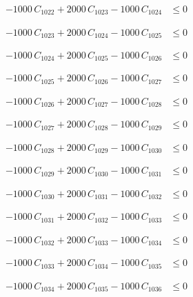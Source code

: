 \documentclass[a4paper,11pt]{article}
\begin{document}
\begin{align}
-1000\,C_{1022} + 2000\,C_{1023} - 1000\,C_{1024} &\leq 0 \nonumber
\end{align}

\begin{align}
-1000\,C_{1023} + 2000\,C_{1024} - 1000\,C_{1025} &\leq 0 \nonumber
\end{align}

\begin{align}
-1000\,C_{1024} + 2000\,C_{1025} - 1000\,C_{1026} &\leq 0 \nonumber
\end{align}

\begin{align}
-1000\,C_{1025} + 2000\,C_{1026} - 1000\,C_{1027} &\leq 0 \nonumber
\end{align}

\begin{align}
-1000\,C_{1026} + 2000\,C_{1027} - 1000\,C_{1028} &\leq 0 \nonumber
\end{align}

\begin{align}
-1000\,C_{1027} + 2000\,C_{1028} - 1000\,C_{1029} &\leq 0 \nonumber
\end{align}

\begin{align}
-1000\,C_{1028} + 2000\,C_{1029} - 1000\,C_{1030} &\leq 0 \nonumber
\end{align}

\begin{align}
-1000\,C_{1029} + 2000\,C_{1030} - 1000\,C_{1031} &\leq 0 \nonumber
\end{align}

\begin{align}
-1000\,C_{1030} + 2000\,C_{1031} - 1000\,C_{1032} &\leq 0 \nonumber
\end{align}

\begin{align}
-1000\,C_{1031} + 2000\,C_{1032} - 1000\,C_{1033} &\leq 0 \nonumber
\end{align}

\begin{align}
-1000\,C_{1032} + 2000\,C_{1033} - 1000\,C_{1034} &\leq 0 \nonumber
\end{align}

\begin{align}
-1000\,C_{1033} + 2000\,C_{1034} - 1000\,C_{1035} &\leq 0 \nonumber
\end{align}

\begin{align}
-1000\,C_{1034} + 2000\,C_{1035} - 1000\,C_{1036} &\leq 0 \nonumber
\end{align}
\end{document}
